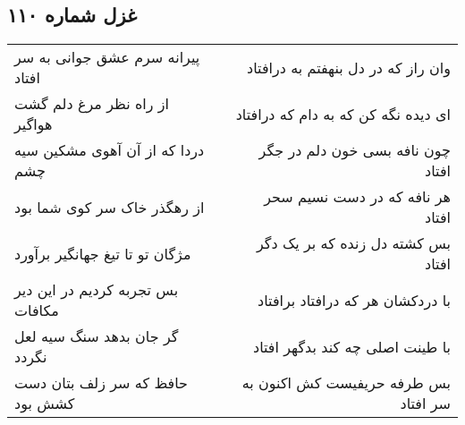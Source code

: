 \begin{center}
\section*{غزل شماره ۱۱۰}
\label{sec:sh110}
\begin{longtable}{l p{0.5cm} r}
پیرانه سرم عشق جوانی به سر افتاد
&&
وان راز که در دل بنهفتم به درافتاد
\\
از راه نظر مرغ دلم گشت هواگیر
&&
ای دیده نگه کن که به دام که درافتاد
\\
دردا که از آن آهوی مشکین سیه چشم
&&
چون نافه بسی خون دلم در جگر افتاد
\\
از رهگذر خاک سر کوی شما بود
&&
هر نافه که در دست نسیم سحر افتاد
\\
مژگان تو تا تیغ جهانگیر برآورد
&&
بس کشته دل زنده که بر یک دگر افتاد
\\
بس تجربه کردیم در این دیر مکافات
&&
با دردکشان هر که درافتاد برافتاد
\\
گر جان بدهد سنگ سیه لعل نگردد
&&
با طینت اصلی چه کند بدگهر افتاد
\\
حافظ که سر زلف بتان دست کشش بود
&&
بس طرفه حریفیست کش اکنون به سر افتاد
\\
\end{longtable}
\end{center}
